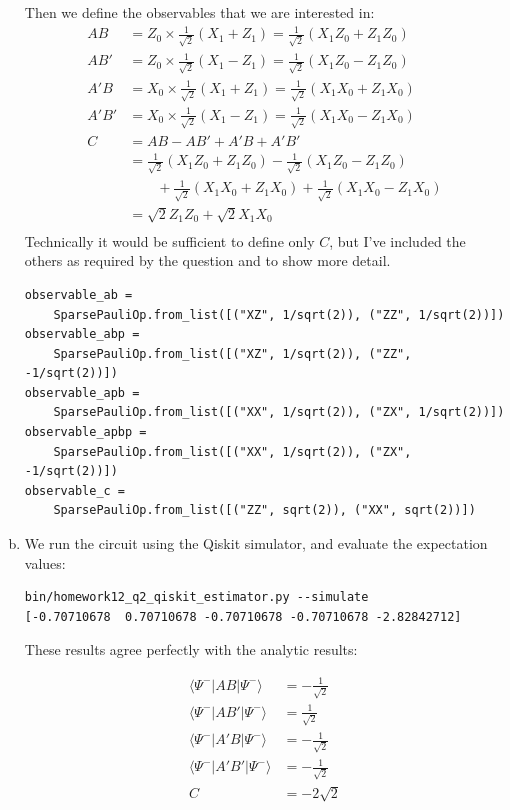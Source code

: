\documentclass[12pt]{extarticle}
\begin{document}
\begin{enumerate}[(a)]
Then we define the observables that we are interested in:
\begin{align*}
AB & = Z_0 \times \frac{1}{\sqrt{2}} (X_1 + Z_1) = \frac{1}{\sqrt{2}} (X_1 Z_0 + Z_1 Z_0) \\
AB' & = Z_0 \times \frac{1}{\sqrt{2}} (X_1 - Z_1) = \frac{1}{\sqrt{2}} (X_1 Z_0 - Z_1 Z_0) \\
A'B & = X_0 \times \frac{1}{\sqrt{2}} (X_1 + Z_1) = \frac{1}{\sqrt{2}} (X_1 X_0 + Z_1 X_0) \\
A'B' & = X_0 \times \frac{1}{\sqrt{2}} (X_1 - Z_1) = \frac{1}{\sqrt{2}} (X_1 X_0 - Z_1 X_0) \\
C & = AB - AB' + A'B + A'B' \\
& = \frac{1}{\sqrt{2}}(X_1 Z_0 + Z_1 Z_0) - \frac{1}{\sqrt{2}} (X_1 Z_0 - Z_1 Z_0) \\
& \qquad + \frac{1}{\sqrt{2}} (X_1 X_0 + Z_1 X_0) + \frac{1}{\sqrt{2}} (X_1 X_0 - Z_1 X_0) \\
& = \sqrt{2} Z_1 Z_0 + \sqrt{2} X_1 X_0 \\
\end{align*}
Technically it would be sufficient to define only $C$, but I've included the others as required by the question and to show more detail.
\begin{small}
\begin{verbatim}
observable_ab =
    SparsePauliOp.from_list([("XZ", 1/sqrt(2)), ("ZZ", 1/sqrt(2))])
observable_abp =
    SparsePauliOp.from_list([("XZ", 1/sqrt(2)), ("ZZ", -1/sqrt(2))])
observable_apb =
    SparsePauliOp.from_list([("XX", 1/sqrt(2)), ("ZX", 1/sqrt(2))])
observable_apbp =
    SparsePauliOp.from_list([("XX", 1/sqrt(2)), ("ZX", -1/sqrt(2))])
observable_c =
    SparsePauliOp.from_list([("ZZ", sqrt(2)), ("XX", sqrt(2))])
\end{verbatim}
\end{small}

\item

We run the circuit using the Qiskit simulator, and evaluate the expectation values:

\begin{verbatim}
bin/homework12_q2_qiskit_estimator.py --simulate
[-0.70710678  0.70710678 -0.70710678 -0.70710678 -2.82842712]
\end{verbatim}

These results agree perfectly with the analytic results:

\begin{align*}
\langle \Psi^{-}|AB|\Psi^{-}\rangle & = -\frac{1}{\sqrt{2}} \\
\langle \Psi^{-}|AB'|\Psi^{-}\rangle & = \frac{1}{\sqrt{2}} \\
\langle \Psi^{-}|A'B|\Psi^{-}\rangle & = -\frac{1}{\sqrt{2}} \\
\langle \Psi^{-}|A'B'|\Psi^{-}\rangle & = -\frac{1}{\sqrt{2}} \\
C & = -2\sqrt{2}
\end{align*}


\end{enumerate}
\end{document}
